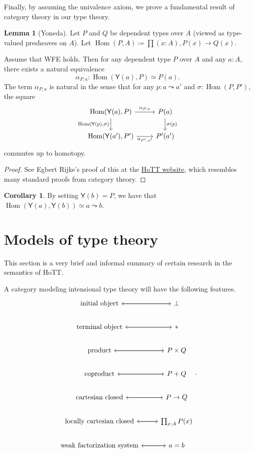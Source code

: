 \documentclass[10pt,letterpaper,cm]{nupset}
\theoremstyle{definition}
\theoremstyle{theorem}
\newtheorem{lemma}[definition]{Lemma}
\newtheorem{corollary}[definition]{Corollary}
\theoremstyle{remark}
\newcommand{\1}{\mathbf{1}}
\newcommand{\0}{\vec 0}
\DeclareMathOperator{\Hom}{Hom}
\begin{document}
Finally, by assuming the univalence axiom, we prove a fundamental result of category theory in our type theory.

\begin{lemma}[Yoneda]
Let $P$ and $Q$ be dependent types over $A$ (viewed as type-valued presheaves on $A$). Let $\Hom(P, A) \coloneqq \prod(x:A), P(x) \to Q(x)$.

\medskip


Assume that WFE holds. Then for any dependent type $P$ over $A$ and any $a: A$, there exists a natural equivalence $$ \alpha_{P,a} :\Hom(\mathsf{Y}(a), P)\simeq P(a) . $$ The term $ \alpha_{P,a} $ is natural in the sense that for any $p: a\leadsto a'$ and $\sigma : \Hom(P, P')$, the square
\[
\begin{tikzcd}
{\Hom(\mathsf{Y}(a), P)} \arrow[r, "{\alpha_{P,a}}"] \arrow[d, "{\Hom(\mathsf{Y}(p), \sigma)}"'] & P(a) \arrow[d, "\sigma(p)"] \\
{\Hom(\mathsf{Y}(a'), P')} \arrow[r, "{\alpha_{P', a'}}"'] & P'(a')
\end{tikzcd}\] commutes up to homotopy.
\end{lemma}
\begin{proof}
See Egbert Rijke's proof of this at the \href{https://homotopytypetheory.org/2012/05/02/a-type-theoretical-yoneda-lemma/}{HoTT website}, which resembles many standard proofs from category theory.
\end{proof}

\begin{corollary}
By setting $\mathsf{Y}(b) = P$, we have that $\Hom(\mathsf{Y}(a), \mathsf{Y}(b)) \simeq a \leadsto b$.
\end{corollary}

\section{Models of type theory}

This section is a very brief and informal summary of certain research in the semantics of HoTT.

\medskip

A category modeling intensional type theory will have the following features.
\[
\begin{tikzcd}
\text{initial object} \arrow[r] & \bot \arrow[l] \\
\text{terminal object} \arrow[r] & \ast \arrow[l] \\
\text{product} \arrow[r] & P\times Q \arrow[l] \\
\text{coproduct} \arrow[r] & P + Q \arrow[l] \\
\text{cartesian closed} \arrow[r] & P \to Q \arrow[l] \\
\text{locally cartesian closed} \arrow[r] & \prod_{x:A}P(x) \arrow[l] \\
\text{weak factorization system} \arrow[r] & a=b \arrow[l]
\end{tikzcd}
.\]
\end{document}
